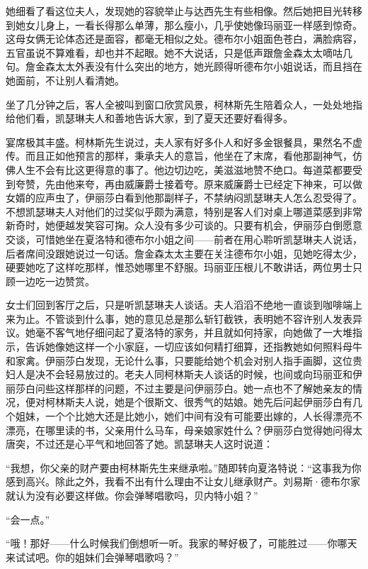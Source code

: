 \par 她细看了看这位夫人，发现她的容貌举止与达西先生有些相像。然后她把目光转移到她女儿身上，一看长得那么单薄，那么瘦小，几乎使她像玛丽亚一样感到惊奇。这母女俩无论体态还是面容，都毫无相似之处。德布尔小姐面色苍白，满脸病容，五官虽说不算难看，却也并不起眼。她不大说话，只是低声跟詹金森太太嘀咕几句。詹金森太太外表没有什么突出的地方，她光顾得听德布尔小姐说话，而且挡在她面前，不让别人看清她。
\par 坐了几分钟之后，客人全被叫到窗口欣赏风景，柯林斯先生陪着众人，一处处地指给他们看，凯瑟琳夫人和善地告诉大家，到了夏天还要好看得多。
\par 宴席极其丰盛。柯林斯先生说过，夫人家有好多仆人和好多金银餐具，果然名不虚传。而且正如他预言的那样，秉承夫人的意旨，他坐在了末席，看他那副神气，仿佛人生不会有比这更得意的事了。他边切边吃，美滋滋地赞不绝口。每道菜都要受到夸赞，先由他来夸，再由威廉爵士接着夸。原来威廉爵士已经定下神来，可以做女婿的应声虫了，伊丽莎白看到他那副样子，不禁纳闷凯瑟琳夫人怎么忍受得了。不想凯瑟琳夫人对他们的过奖似乎颇为满意，特别是客人们对桌上哪道菜感到非常新奇时，她便越发笑容可掬。众人没有多少可谈的。只要有机会，伊丽莎白倒愿意交谈，可惜她坐在夏洛特和德布尔小姐之间——前者在用心聆听凯瑟琳夫人说话，后者席间没跟她说过一句话。詹金森太太主要在关注德布尔小姐，见她吃得太少，硬要她吃了这样吃那样，惟恐她哪里不舒服。玛丽亚压根儿不敢讲话，两位男士只顾一边吃一边赞赏。
\par 女士们回到客厅之后，只是听凯瑟琳夫人谈话。夫人滔滔不绝地一直谈到咖啡端上来为止。不管谈到什么事，她的意见总是那么斩钉截铁，表明她不容许别人发表异议。她毫不客气地仔细问起了夏洛特的家务，并且就如何持家，向她做了一大堆指示，告诉她像她这样一个小家庭，一切应该如何精打细算，还指教她如何照料母牛和家禽。伊丽莎白发现，无论什么事，只要能给她个机会对别人指手画脚，这位贵妇人是决不会轻易放过的。老夫人同柯林斯夫人谈话的时候，也间或向玛丽亚和伊丽莎白问些这样那样的问题，不过主要是问伊丽莎白。她一点也不了解她亲友的情况，便对柯林斯夫人说，她是个很斯文、很秀气的姑娘。她先后问起伊丽莎白有几个姐妹，一个个比她大还是比她小，她们中间有没有可能要出嫁的，人长得漂亮不漂亮，在哪里读的书，父亲用什么马车，母亲娘家姓什么？伊丽莎白觉得她问得太唐突，不过还是心平气和地回答了她。凯瑟琳夫人这时说道：
\par “我想，你父亲的财产要由柯林斯先生来继承啦。”随即转向夏洛特说：“这事我为你感到高兴。除此之外，我看不出有什么理由不让女儿继承财产。刘易斯·德布尔家就认为没有必要这样做。你会弹琴唱歌吗，贝内特小姐？”
\par “会一点。”
\par “哦！那好——什么时候我们倒想听一听。我家的琴好极了，可能胜过——你哪天来试试吧。你的姐妹们会弹琴唱歌吗？”

